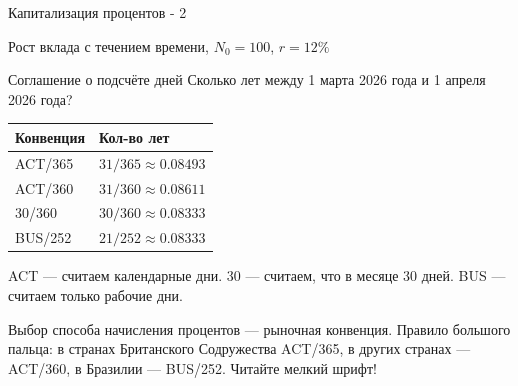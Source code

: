 \documentclass{beamer}
\begin{document}
\begin{frame}{Капитализация процентов - 2}

	\centering
	\scriptsize{Рост вклада с течением времени, $N_0=100$, $r=12\%$}
\end{frame}



\begin{frame}{Соглашение о подсчёте дней}
\justify
Сколько лет между 1 марта 2026 года и 1 апреля 2026 года?

\centering
\begin{tabular}{l|l}
Конвенция & Кол-во лет \\ \hline
ACT/365 & $31/365 \approx 0.08493$ \\
ACT/360 & $31/360 \approx 0.08611$ \\
30/360  & $30/360 \approx 0.08333$ \\
BUS/252 & $21/252 \approx 0.08333$ 
\end{tabular}

\justify
ACT --- считаем календарные дни. 30 --- считаем, что в месяце 30 дней. BUS --- считаем только рабочие дни.

\justify
Выбор способа начисления процентов --- рыночная конвенция. Правило большого пальца: в странах Британского Содружества ACT/365, в других странах --- ACT/360, в Бразилии --- BUS/252. Читайте мелкий шрифт! 
\end{frame}
\end{document}
